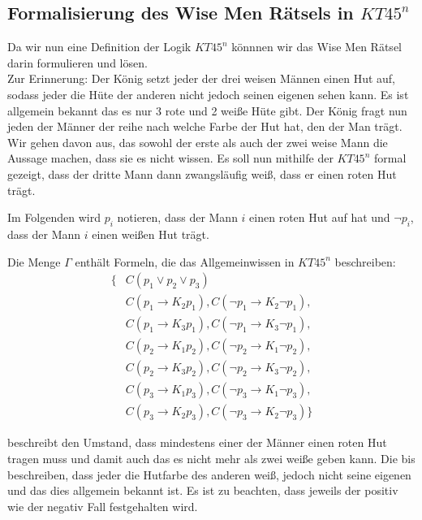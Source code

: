 \subsection{Formalisierung des Wise Men Rätsels in $KT45^n$}
Da wir nun eine Definition der Logik $KT45^n$ könnnen wir das Wise Men Rätsel darin formulieren und lösen.\\
Zur Erinnerung: Der König setzt jeder der drei weisen Männen einen Hut auf, sodass jeder die Hüte der anderen nicht jedoch seinen eigenen sehen kann.
Es ist allgemein bekannt das es nur 3 rote und 2 weiße Hüte gibt.
Der König fragt nun jeden der Männer der reihe nach welche Farbe der Hut hat, den der Man trägt.
Wir gehen davon aus, das sowohl der erste als auch der zwei weise Mann die Aussage machen, dass sie es nicht wissen.
Es soll nun mithilfe der $KT45^n$ formal gezeigt, dass der dritte Mann dann zwangsläufig weiß, dass er einen roten Hut trägt.

Im Folgenden wird $p_i$ notieren, dass der Mann $i$ einen roten Hut auf hat und 
$\neg p_i$, dass der Mann $i$ einen weißen Hut trägt.

Die Menge $\Gamma$ enthält Formeln, die das Allgemeinwissen in $KT45^n$ beschreiben:
\begin{subequations}
	\begin{align}
		\{&C(p_1 \vee p_2 \vee p_3) \label{eq:min_ein_roter_hut}\\
		\label{eq:zweiter_kennt_farbe_von_erster}
		&C(p_1 \rightarrow K_2 p_1), C(\neg p_1 \rightarrow K_2 \neg p_1),\\
		&C(p_1 \rightarrow K_3 p_1), C(\neg p_1 \rightarrow K_3 \neg p_1),\\
		&C(p_2 \rightarrow K_1 p_2), C(\neg p_2 \rightarrow K_1 \neg p_2),\\
		&C(p_2 \rightarrow K_3 p_2), C(\neg p_2 \rightarrow K_3 \neg p_2),\\
		&C(p_3 \rightarrow K_1 p_3), C(\neg p_3 \rightarrow K_1 \neg p_3),\\
		\label{eq:zweiter_kennt_farbe_von_letzter}
		&C(p_3 \rightarrow K_2 p_3), C(\neg p_3 \rightarrow K_2 \neg p_3)\}
	\end{align}
\end{subequations}

 beschreibt den Umstand, dass mindestens einer der Männer einen roten Hut tragen muss und damit auch das es nicht mehr als zwei weiße geben kann.
Die  bis  beschreiben, dass jeder die Hutfarbe des anderen weiß, jedoch nicht seine eigenen und das dies allgemein bekannt ist.
Es ist zu beachten, dass jeweils der positiv wie der negativ Fall festgehalten wird.


